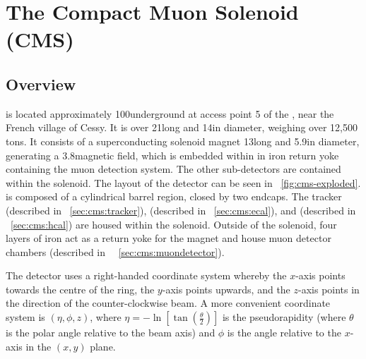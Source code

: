\section{The Compact Muon Solenoid (CMS)}
\label{sec:cms}

\subsection{Overview}
\label{sec:cms:overview}

\CMS is located approximately 100\m underground at access point 5 of the \LHC, near the French village of Cessy. It is over 21\m long and 14\m in diameter, weighing over 12,500 tons. It consists of a superconducting solenoid magnet 13\m long and 5.9\m in diameter, generating a 3.8\T magnetic field, which is embedded within in iron return yoke containing the muon detection system. The other sub-detectors are contained within the solenoid. The layout of the \CMS detector can be seen in \Fig~\ref{fig:cms-exploded}. \CMS is composed of a cylindrical barrel region, closed by two endcaps. The tracker (described in \Sec~\ref{sec:cms:tracker}), \ECAL (described in \Sec~\ref{sec:cms:ecal}), and \HCAL (described in \Sec~\ref{sec:cms:hcal}) are housed within the solenoid. Outside of the solenoid, four layers of iron act as a return yoke for the magnet and house muon detector chambers (described in \Sec~~\ref{sec:cms:muondetector}). 

The \CMS detector uses a right-handed coordinate system whereby the $x$-axis points towards the centre of the \LHC ring, the $y$-axis points upwards, and the $z$-axis points in the direction of the counter-clockwise beam. A more convenient coordinate system is $(\eta,\phi,z)$, where $\eta = -\ln [ \tan(\frac{\theta}{2})]$ is the pseudorapidity (where $\theta$ is the polar angle relative to the beam axis) and $\phi$ is the angle relative to the $x$-axis in the $(x,y)$ plane. 


